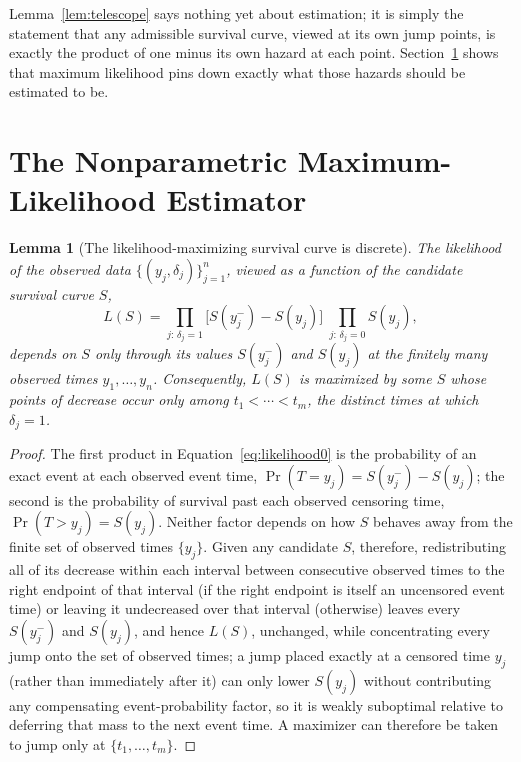 \documentclass[11pt]{article}
\newtheorem{lemma}{Lemma}
\theoremstyle{remark}
\theoremstyle{definition}
\begin{document}
Lemma~\ref{lem:telescope} says nothing yet about estimation; it is simply the statement that any admissible survival curve, viewed at its own jump points, is exactly the product of one minus its own hazard at each point. Section~\ref{sec:mle} shows that maximum likelihood pins down exactly what those hazards should be estimated to be.

\section{The Nonparametric Maximum-Likelihood Estimator}
\label{sec:mle}

\begin{lemma}[The likelihood-maximizing survival curve is discrete]
\label{lem:discrete}
The likelihood of the observed data $\{(y_j,\delta_j)\}_{j=1}^n$, viewed as a function of the candidate survival curve $S$,
\begin{equation}
L(S) = \prod_{j:\,\delta_j=1}\big[S(y_j^-)-S(y_j)\big]\;\prod_{j:\,\delta_j=0} S(y_j),
\label{eq:likelihood0}
\end{equation}
depends on $S$ only through its values $S(y_j^-)$ and $S(y_j)$ at the finitely many observed times $y_1,\ldots,y_n$. Consequently, $L(S)$ is maximized by some $S$ whose points of decrease occur only among $t_1<\cdots<t_m$, the distinct times at which $\delta_j=1$.
\end{lemma}
\begin{proof}
The first product in Equation~\eqref{eq:likelihood0} is the probability of an exact event at each observed event time, $\Pr(T=y_j)=S(y_j^-)-S(y_j)$; the second is the probability of survival past each observed censoring time, $\Pr(T>y_j)=S(y_j)$. Neither factor depends on how $S$ behaves away from the finite set of observed times $\{y_j\}$. Given any candidate $S$, therefore, redistributing all of its decrease within each interval between consecutive observed times to the right endpoint of that interval (if the right endpoint is itself an uncensored event time) or leaving it undecreased over that interval (otherwise) leaves every $S(y_j^-)$ and $S(y_j)$, and hence $L(S)$, unchanged, while concentrating every jump onto the set of observed times; a jump placed exactly at a censored time $y_j$ (rather than immediately after it) can only lower $S(y_j)$ without contributing any compensating event-probability factor, so it is weakly suboptimal relative to deferring that mass to the next event time. A maximizer can therefore be taken to jump only at $\{t_1,\ldots,t_m\}$.
\end{proof}
\end{document}
